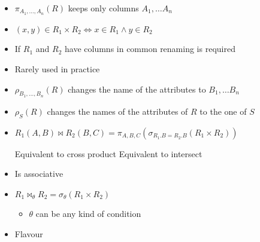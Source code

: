 \begin{itemize}
\begin{itemize}
\begin{itemize}
                    \item $\pi_{A_1,\dots,A_n} (R)$ keeps only columns $A_1, \dots A_n$
                \end{itemize}
                \begin{itemize}
                    \item $(x, y) \in R_1 \times R_2 \iff x \in R_1 \land y \in R_2$
                    \item If $R_1$ and $R_2$ have columns in common renaming is required
                    \item Rarely used in practice
                \end{itemize}
                \begin{itemize}
                    \item $\rho_{B_1, \dots, B_n} (R)$ changes the name of the attributes to $B_1, \dots B_n$
                    \item $\rho_S(R)$ changes the names of the attributes of $R$ to the one of $S$
                \end{itemize}
                \begin{itemize}
                    \item $R_1 (A, B) \bowtie R_2 (B, C) = \pi_{A, B, C} (\sigma_{R_1.B = R_2.B}(R_1 \times R_2))$
                            \begin{itemize}
                                 Equivalent to cross product
                                 Equivalent to intersect
                            \end{itemize}
                    \item Is associative
                \end{itemize}
                \begin{itemize}
                    \item $R_1 \bowtie_\theta R_2 = \sigma_\theta (R_1 \times R_2)$
                        \begin{itemize}
                            \item $\theta$ can be any kind of condition
                        \end{itemize}
                    \item Flavour
                        \begin{itemize}

\end{itemize}
\end{itemize}
\end{itemize}
\end{itemize}
